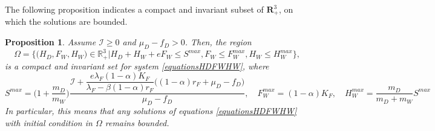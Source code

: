\documentclass{article}
\newcommand{\lfw}{\lambda_{F}}
\newcommand{\lfw}{\lambda_{F}}
\newcommand{\cI}{\mathcal{I}}
\newtheorem{prop}{Proposition}
\begin{document}
The following proposition indicates a compact and invariant subset of $\mathbf{R}_+^3$, on which the solutions are bounded.

\begin{prop}\label{Invariant region, cI>=0} 
Assume $\cI \geq 0$ and $\mu_D - f_D > 0$. Then, the region
$$\Omega = \Big\{\Big(H_D, F_W, H_W \Big) \in \mathbb{R}_+^3  \Big|H_D + H_W + eF_W \leq S^{max}, F_W \leq F_W^{max}, H_W \leq H_W^{max} \Big\},$$
is a compact and invariant set for system \eqref{equationsHDFWHW}, 
where
$$
S^{max} = \Big(1 + \dfrac{m_D}{m_W} \Big) \dfrac{\cI + \dfrac{e \lfw (1-\alpha) K_F}{\lfw - \beta (1-\alpha) r_F} \Big((1-\alpha)r_F + \mu_D - f_D\Big)}{\mu_D - f_D},
\quad
F_W^{max} = (1-\alpha)K_F,
\quad
H_W^{max} = \dfrac{m_D}{m_D + m_W} S^{max}
$$
In particular, this means that any solutions of equations \eqref{equationsHDFWHW} with initial condition in $\Omega$ remains bounded.
\end{prop}
%
\end{document}
